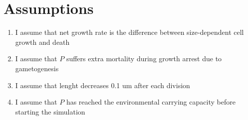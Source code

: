 \documentclass[a4paper,oneside]{article}
\begin{document}
  \section*{Assumptions} 
    \begin{enumerate}
      \item I assume that net growth rate is the difference between size-dependent cell growth and death
      \item I assume that $P$ suffers extra mortality during growth arrest due to gametogenesis
      \item I assume that lenght decreases 0.1 um after each division
      \item I assume that $P$ has reached the environmental carrying capacity before starting the simulation
    \end{enumerate}
\end{document}
